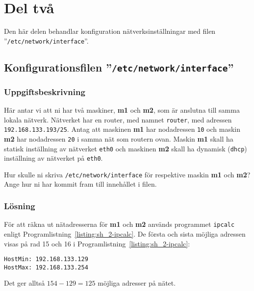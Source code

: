 %
%
%


\section{Del två}
Den här delen behandlar konfiguration nätverksinställningar med filen
''\texttt{/etc/network/interface}''.


\subsection{Konfigurationsfilen ''\texttt{/etc/network/interface}''}
\subsubsection{Uppgiftsbeskrivning}
Här antar vi att ni har två maskiner, \textbf{m1} och \textbf{m2}, som är
anslutna till samma lokala nätverk.  Nätverket har en router, med namnet
\texttt{router}, med adressen \texttt{192.168.133.193/25}. Antag att maskinen
\textbf{m1} har nodadressen \texttt{10} och maskin \textbf{m2} har nodadressen
\texttt{20} i samma nät som routern ovan. Maskin \textbf{m1} skall ha statisk
inställning av nätverket \texttt{eth0} och maskinen \textbf{m2} skall ha
dynamisk (\texttt{dhcp}) inställning av nätverket på \texttt{eth0}.

Hur skulle ni skriva \texttt{/etc/network/interface} för respektive maskin
\textbf{m1} och \textbf{m2}?  Ange hur ni har kommit fram till innehållet i
filen.


\subsubsection{Lösning}
För att räkna ut nätadresserna för \textbf{m1} och \textbf{m2} används programmet
\texttt{ipcalc} enligt Programlistning~\ref{listing:sh_2-ipcalc}.
De första och sista möjliga adressen visas på rad 15 och 16 i Programlistning~\ref{listing:sh_2-ipcalc}:
\begin{verbatim}
HostMin: 192.168.133.129
HostMax: 192.168.133.254
\end{verbatim}
Det ger alltså $154 - 129 = 125$ möjliga adresser på nätet.

